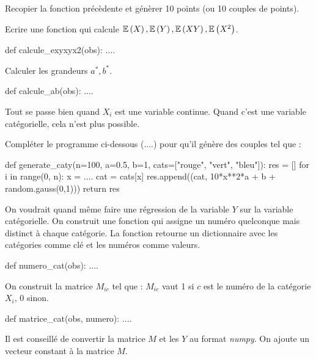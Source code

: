 \begin{xexercice}
\exequest Recopier la fonction précèdente et génèrer 10 points (ou 10 couples de points).

\exequest Ecrire une fonction qui calcule $\mathbb{E}\left(X\right), \mathbb{E}\left(Y\right), \mathbb{E}\left(XY\right), \mathbb{E}\left(X^2\right)$.

\begin{verbatimx}
def calcule_exyxyx2(obs):
    ....
\end{verbatimx}


\exequest Calculer les grandeurs $a^*, b^*$.

\begin{verbatimx}
def calcule_ab(obs):
    ....
\end{verbatimx}

Tout se passe bien quand $X_i$ est une variable continue.
Quand c'est une variable catégorielle, cela n'est plus possible.

\exequest Compléter le programme ci-dessous (....) pour qu'il génère des couples tel que :

\begin{verbatimx}
\end{verbatimx}

\begin{verbatimx}
def generate_caty(n=100, a=0.5, b=1, cats=["rouge", "vert", "bleu"]):
    res = []
    for i in range(0, n):
        x = ....
        cat = cats[x]
        res.append((cat, 10*x**2*a + b + random.gauss(0,1)))
    return res
\end{verbatimx}

\exequest On voudrait quand même faire une régression de la variable $Y$ sur la variable catégorielle. On construit une fonction qui assigne un numéro quelconque mais distinct à chaque catégorie. La fonction retourne un dictionnaire avec les catégories comme clé et les numéros comme valeurs.

\begin{verbatimx}
def numero_cat(obs):
    ....
\end{verbatimx}

\exequest On construit la matrice $M_{ic}$ tel que : $M_{ic}$ vaut 1 si $c$ est le numéro de la catégorie $X_i$, 0 sinon.

\begin{verbatimx}
def matrice_cat(obs, numero):
    ....
\end{verbatimx}

\exequest Il est conseillé de convertir la matrice $M$ et les $Y$ au format \textit{numpy}. On ajoute un vecteur constant à la matrice $M$.


\end{xexercice}
